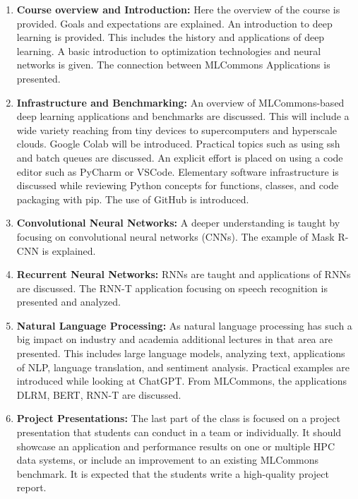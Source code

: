 \documentclass[utf8]{FrontiersinVancouver} %
\begin{document}
\begin{enumerate}
  
\item{\bf Course overview and Introduction:} Here the overview of the
  course is provided. Goals and expectations are explained. An
  introduction to deep learning is provided. This includes the history
  and applications of deep learning. A basic introduction to
  optimization technologies and neural networks is given. The
  connection between MLCommons Applications is presented.

\item{\bf Infrastructure and Benchmarking:} An overview of
  MLCommons-based deep learning applications and benchmarks are
  discussed. This will include a wide variety reaching from tiny
  devices to supercomputers and hyperscale clouds. Google Colab will
  be introduced. Practical topics such as using ssh and batch queues
  are discussed. An explicit effort is placed on using a code editor
  such as PyCharm or VSCode. Elementary software infrastructure is
  discussed while reviewing Python concepts for functions, classes,
  and code packaging with pip. The use of GitHub is introduced.
  
\item{\bf Convolutional Neural Networks:} A deeper understanding is taught
  by focusing on convolutional neural networks (CNNs). The example of
  Mask R-CNN is explained.

\item{\bf Recurrent Neural Networks:} RNNs are taught and applications of
  RNNs are discussed. The RNN-T application focusing on speech
  recognition is presented and analyzed.

\item{\bf Natural Language Processing:} As natural language processing
  has such a big impact on industry and academia additional lectures
  in that area are presented. This includes large language models,
  analyzing text, applications of NLP, language translation, and
  sentiment analysis.  Practical examples are introduced while looking
  at ChatGPT. From MLCommons, the applications DLRM, BERT, RNN-T are
  discussed.

\item{\bf Project Presentations:} The last part of the class is
  focused on a project presentation that students can conduct in a
  team or individually. It should showcase an application and
  performance results on one or multiple HPC data systems, or include
  an improvement to an existing MLCommons benchmark. It is expected
  that the students write a high-quality project report.
  
 \end{enumerate}
\end{document}
